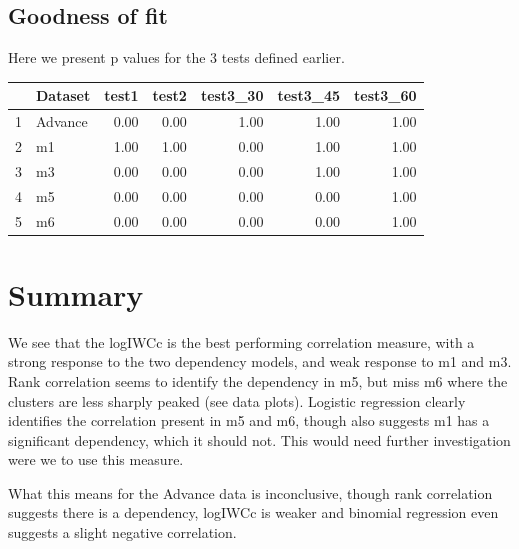 \documentclass[11pt,a4,singlespacing,titlepagenumber=on]{scrreprt}
\numberwithin{equation}{chapter} %
\theoremstyle{remark}
\begin{document}
\subsection{Goodness of fit}

Here we present p values for the 3 tests defined earlier.
\begin{table}[ht]
\centering
\begin{tabular}{rlrrrrr}
  \hline
 & Dataset & test1 & test2 & test3\_30 & test3\_45 & test3\_60 \\ 
  \hline
  1 & Advance & 0.00 & 0.00 & 1.00 & 1.00 & 1.00 \\ 
  2 & m1 & 1.00 & 1.00 & 0.00 & 1.00 & 1.00 \\ 
  3 & m3 & 0.00 & 0.00 & 0.00 & 1.00 & 1.00 \\ 
  4 & m5 & 0.00 & 0.00 & 0.00 & 0.00 & 1.00 \\ 
  5 & m6 & 0.00 & 0.00 & 0.00 & 0.00 & 1.00 \\ 
   \hline
\end{tabular}
\end{table}


\section{Summary}

We see that the logIWCc is the best performing correlation measure, with a strong response to the two dependency models, and weak response to m1 and m3. Rank correlation seems to identify the dependency in m5, but miss m6 where the clusters are less sharply peaked (see data plots). Logistic regression clearly identifies the correlation present in m5 and m6, though also suggests m1 has a significant dependency, which it should not. This would need further investigation were we to use this measure.

What this means for the Advance data is inconclusive, though rank correlation suggests there is a dependency, logIWCc is weaker and binomial regression even suggests a slight negative correlation.
\end{document}
